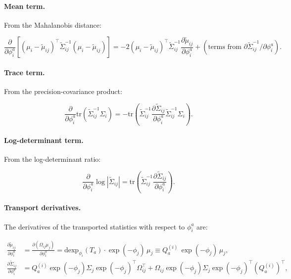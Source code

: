 \documentclass[twoside,11pt]{article}
\begin{document}
\paragraph{Mean term.} From the Mahalanobis distance:

\begin{equation}
\frac{\partial}{\partial \phi_i^a}\left[(\mu_i - \tilde{\mu}_{ij})^\top \tilde{\Sigma}_{ij}^{-1}(\mu_i - \tilde{\mu}_{ij})\right]
= -2(\mu_i - \tilde{\mu}_{ij})^\top \tilde{\Sigma}_{ij}^{-1} \frac{\partial \tilde{\mu}_{ij}}{\partial \phi_i^a}
+ (\text{terms from } \partial\tilde{\Sigma}_{ij}^{-1}/\partial\phi_i^a).
\label{eq:mean_term_phi}
\end{equation}

\paragraph{Trace term.} From the precision-covariance product:

\begin{equation}
\frac{\partial}{\partial \phi_i^a}\mathrm{tr}(\tilde{\Sigma}_{ij}^{-1}\Sigma_i)
= -\mathrm{tr}\!\left(\tilde{\Sigma}_{ij}^{-1} \frac{\partial \tilde{\Sigma}_{ij}}{\partial \phi_i^a} \tilde{\Sigma}_{ij}^{-1} \Sigma_i\right).
\label{eq:trace_term_phi}
\end{equation}

\paragraph{Log-determinant term.} From the log-determinant ratio:

\begin{equation}
\frac{\partial}{\partial \phi_i^a}\log|\tilde{\Sigma}_{ij}|
= \mathrm{tr}\!\left(\tilde{\Sigma}_{ij}^{-1} \frac{\partial \tilde{\Sigma}_{ij}}{\partial \phi_i^a}\right).
\label{eq:logdet_term_phi}
\end{equation}

\paragraph{Transport derivatives.} The derivatives of the transported statistics with respect to $\phi_i^a$ are:

\begin{align}
\frac{\partial \tilde{\mu}_{ij}}{\partial \phi_i^a} &= \frac{\partial (\Omega_{ij}\mu_j)}{\partial \phi_i^a}
= \mathrm{dexp}_{\phi_i}(T_a) \cdot \exp(-\phi_j) \, \mu_j
\equiv Q_a^{(i)} \, \exp(-\phi_j) \, \mu_j, \label{eq:dtilde_mu} \\
\frac{\partial \tilde{\Sigma}_{ij}}{\partial \phi_i^a} &=
Q_a^{(i)} \exp(-\phi_j) \Sigma_j \exp(-\phi_j)^\top \Omega_{ij}^\top
+ \Omega_{ij} \exp(-\phi_j) \Sigma_j \exp(-\phi_j)^\top (Q_a^{(i)})^\top, \label{eq:dtilde_Sigma}
\end{align}
\end{document}

